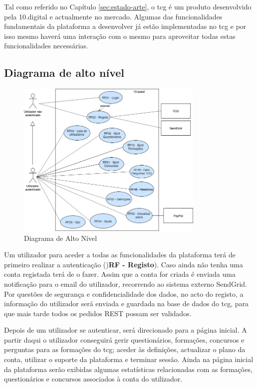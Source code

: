 Tal como referido no Capítulo \ref{sec:estado-arte}, o \acrshort{tcg} é um produto desenvolvido pela 10.digital e actualmente no mercado. Algumas das funcionalidades fundamentais da plataforma a desenvolver já estão implementadas no \acrshort{tcg}  e por isso mesmo haverá uma interação com o mesmo para aproveitar todas estas funcionalidades necessárias.


\newpage

\subsection{Diagrama de alto nível}
\label{d:altonivel}
\begin{figure}[ht!]
	\begin{center}
		\includegraphics[width=0.8\textwidth]{img/rf/alto-nivel}
		\caption{Diagrama de Alto Nível}
		\label{fig:rf-alto-nivel}
	\end{center}
\end{figure}

Um utilizador para aceder a todas as funcionalidades da plataforma terá de primeiro realizar a autenticação ()\textbf{RF - Registo}). Caso ainda não tenha uma conta registada terá de o fazer. Assim que a conta for criada é enviada uma notificação para o email do utilizador, recorrendo ao sistema externo SendGrid. Por questões de segurança e confidencialidade dos dados, no acto do registo, a informação do utilizador será enviada e guardada na base de dados do \acrshort{tcg}, para que mais tarde todos os pedidos REST possam ser validados.

Depois de um utilizador se autenticar, será direcionado para a página inicial. A partir daqui o utilizador conseguirá gerir questionários, formações, concursos e perguntas para as formações do \acrshort{tcg}; aceder às definições, actualizar o plano da conta, utilizar o suporte da plataforma e terminar sessão.
Ainda na página inicial da plataforma serão exibidas algumas estatísticas relacionadas com as formações, questionários e concursos associados à conta do utilizador. 

